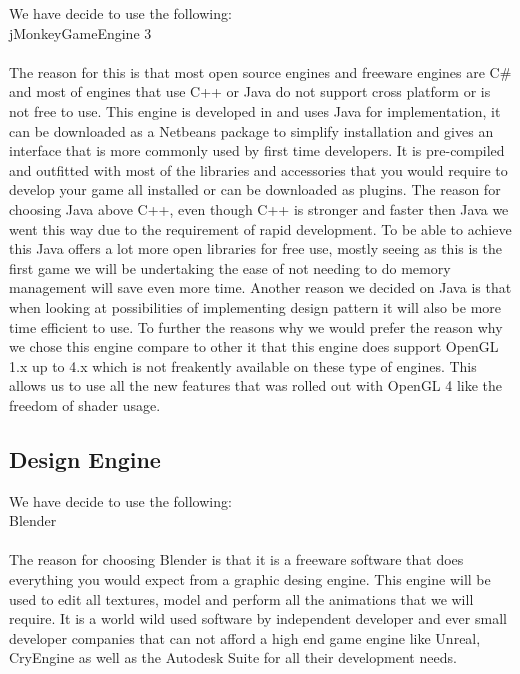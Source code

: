 \documentclass[letterpaper]{article}
\begin{document}
			We have decide to use the following: \\
			\indent jMonkeyGameEngine 3 \\
			\\
			The reason for this is that most open source engines and freeware engines are C\# and most of engines that use C++ or Java do not support cross platform or is not free to use. This engine is developed in and uses Java for implementation, it can be downloaded as a Netbeans package to simplify installation and gives an interface that is more commonly used by first time developers. It is pre-compiled and outfitted with most of the libraries and accessories that you would require to develop your game all installed or can be downloaded as plugins. The reason for choosing Java above C++, even though C++ is stronger and faster then Java we went this way due to the requirement of rapid development. To be able to achieve this Java offers a lot more open libraries for free use, mostly seeing as this is the first game we will be undertaking the ease of not needing to do memory management will save even more time. Another reason we decided on Java is that when looking at possibilities of implementing design pattern it will also be more time efficient to use. To further the reasons why we would prefer the reason why we chose this engine compare to other it that this engine does support OpenGL 1.x up to 4.x which is not freakently available on these type of engines. This allows us to use all the new features that was rolled out with OpenGL 4 like the freedom of shader usage.
			
			\vspace{0.1cm}
			
			\subsection*{Design Engine}
			
			\vspace{0.1cm}
			
			We have decide to use the following: \\
			\indent Blender \\
			\\
			The reason for choosing Blender is that it is a freeware software that does everything you would expect from a graphic desing engine. This engine will be used to edit all textures, model and perform all the animations that we will require. It is a world wild used software by independent developer and ever small developer companies that can not afford a high end game engine like Unreal, CryEngine as well as the Autodesk Suite for all their development needs.
			
\end{document}
